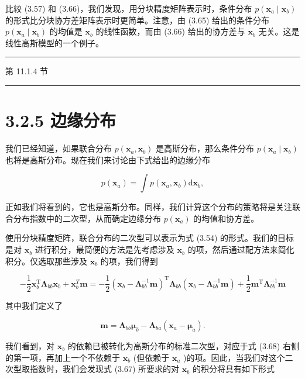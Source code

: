 \documentclass[10pt]{report}
\newcommand{\HRule}{\begin{center}\rule{0.9\linewidth}{0.2mm}\end{center}}
\begin{document}
比较 (3.57) 和 (3.66)，我们发现，用分块精度矩阵表示时，条件分布 \(p\left( {{\mathbf{x}}_{a} \mid  {\mathbf{x}}_{b}}\right)\) 的形式比分块协方差矩阵表示时更简单。注意，由 (3.65) 给出的条件分布 \(p\left( {{\mathbf{x}}_{a} \mid  {\mathbf{x}}_{b}}\right)\) 的均值是 \({\mathbf{x}}_{b}\) 的线性函数，而由 (3.66) 给出的协方差与 \({\mathbf{x}}_{b}\) 无关。这是线性高斯模型的一个例子。

\HRule

第 11.1.4 节

\HRule

\section*{3.2.5 边缘分布}

我们已经知道，如果联合分布 \(p\left( {{\mathbf{x}}_{a},{\mathbf{x}}_{b}}\right)\) 是高斯分布，那么条件分布 \(p\left( {{\mathbf{x}}_{a} \mid  {\mathbf{x}}_{b}}\right)\) 也将是高斯分布。现在我们来讨论由下式给出的边缘分布

\[
p\left( {\mathbf{x}}_{a}\right)  = \int p\left( {{\mathbf{x}}_{a},{\mathbf{x}}_{b}}\right) \mathrm{d}{\mathbf{x}}_{b}, \tag{3.67}
\]

正如我们将看到的，它也是高斯分布。同样，我们计算这个分布的策略将是关注联合分布指数中的二次型，从而确定边缘分布 \(p\left( {\mathbf{x}}_{a}\right)\) 的均值和协方差。

使用分块精度矩阵，联合分布的二次型可以表示为式 (3.54) 的形式。我们的目标是对 \({\mathbf{x}}_{b}\) 进行积分，最简便的方法是先考虑涉及 \({\mathbf{x}}_{b}\) 的项，然后通过配方法来简化积分。仅选取那些涉及 \({\mathbf{x}}_{b}\) 的项，我们得到

\[
- \frac{1}{2}{\mathbf{x}}_{b}^{\mathrm{T}}{\mathbf{\Lambda }}_{bb}{\mathbf{x}}_{b} + {\mathbf{x}}_{b}^{T}\mathbf{m} =  - \frac{1}{2}{\left( {\mathbf{x}}_{b} - {\mathbf{\Lambda }}_{bb}^{-1}\mathbf{m}\right) }^{\mathrm{T}}{\mathbf{\Lambda }}_{bb}\left( {{\mathbf{x}}_{b} - {\mathbf{\Lambda }}_{bb}^{-1}\mathbf{m}}\right)  + \frac{1}{2}{\mathbf{m}}^{\mathrm{T}}{\mathbf{\Lambda }}_{bb}^{-1}\mathbf{m} \tag{3.68}
\]

其中我们定义了

\[
\mathbf{m} = {\mathbf{\Lambda }}_{bb}{\mathbf{\mu }}_{b} - {\mathbf{\Lambda }}_{ba}\left( {{\mathbf{x}}_{a} - {\mathbf{\mu }}_{a}}\right) . \tag{3.69}
\]

我们看到，对 \({\mathbf{x}}_{b}\) 的依赖已被转化为高斯分布的标准二次型，对应于式 (3.68) 右侧的第一项，再加上一个不依赖于 \({\mathbf{x}}_{b}\) (但依赖于 \({\mathbf{x}}_{a}\) )的项。因此，当我们对这个二次型取指数时，我们会发现式 (3.67) 所要求的对 \({\mathbf{x}}_{b}\) 的积分将具有如下形式
\end{document}
